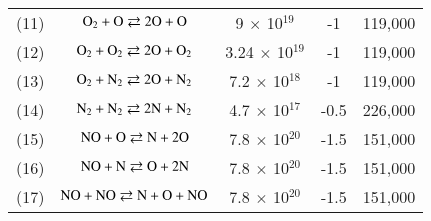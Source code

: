 \documentclass{warpdoc}
\begin{document}
\begin{table}[t]
\begin{center}
\begin{threeparttable}
\begin{tabular}{ccccc}
(11) & $\rm O_2 + O \rightleftarrows 2O + O$ & 9 $\times$ 10$^{19}$ & -1 & 119,000 \\
(12) & $\rm O_2 + O_2 \rightleftarrows 2O + O_2$ & 3.24 $\times$ 10$^{19}$ & -1 & 119,000 \\
(13) & $\rm O_2 + N_2 \rightleftarrows 2O + N_2$ & 7.2 $\times$ 10$^{18}$ & -1 & 119,000 \\
(14) & $\rm N_2 + N_2 \rightleftarrows 2N + N_2$ & 4.7 $\times$ 10$^{17}$ & -0.5 & 226,000 \\
(15) & $\rm NO + O \rightleftarrows N + 2O$ & 7.8 $\times$ 10$^{20}$ & -1.5 & 151,000 \\
(16) & $\rm NO + N \rightleftarrows O + 2N$ & 7.8 $\times$ 10$^{20}$ & -1.5 & 151,000 \\
(17) & $\rm NO + NO \rightleftarrows N + O + NO$ & 7.8 $\times$ 10$^{20}$ & -1.5 & 151,000 \\
\bottomrule
\end{tabular}
\label{tab:dunn-kang}
\end{threeparttable}
\end{center}
\end{table}
%
\end{document}
